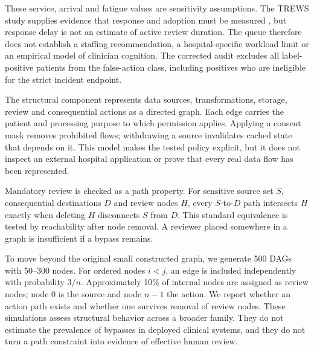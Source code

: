 These service, arrival and fatigue values are sensitivity assumptions. The TREWS study supplies evidence that response and adoption must be measured \citep{trews}, but response delay is not an estimate of active review duration. The queue therefore does not establish a staffing recommendation, a hospital-specific workload limit or an empirical model of clinician cognition. The corrected audit excludes all label-positive patients from the false-action class, including positives who are ineligible for the strict incident endpoint.

The structural component represents data sources, transformations, storage, review and consequential actions as a directed graph. Each edge carries the patient and processing purpose to which permission applies. Applying a consent mask removes prohibited flows; withdrawing a source invalidates cached state that depends on it. This model makes the tested policy explicit, but it does not inspect an external hospital application or prove that every real data flow has been represented.

Mandatory review is checked as a path property. For sensitive source set $S$, consequential destinations $D$ and review nodes $H$, every $S$-to-$D$ path intersects $H$ exactly when deleting $H$ disconnects $S$ from $D$. This standard equivalence is tested by reachability after node removal. A reviewer placed somewhere in a graph is insufficient if a bypass remains.

To move beyond the original small constructed graph, we generate 500 DAGs with 50--300 nodes. For ordered nodes $i<j$, an edge is included independently with probability $3/n$. Approximately 10\% of internal nodes are assigned as review nodes; node 0 is the source and node $n-1$ the action. We report whether an action path exists and whether one survives removal of review nodes. These simulations assess structural behavior across a broader family. They do not estimate the prevalence of bypasses in deployed clinical systems, and they do not turn a path constraint into evidence of effective human review.
